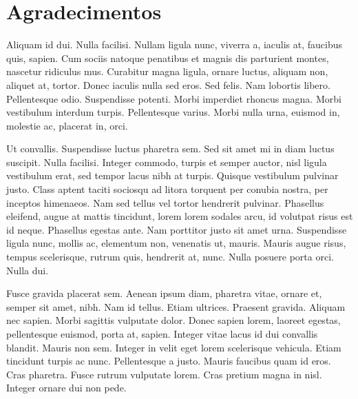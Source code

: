 \chapter*{Agradecimentos}

Aliquam id dui. Nulla facilisi. Nullam ligula nunc, viverra a, iaculis
at, faucibus quis, sapien. Cum sociis natoque penatibus et magnis dis
parturient montes, nascetur ridiculus mus. Curabitur magna ligula,
ornare luctus, aliquam non, aliquet at, tortor. Donec iaculis nulla
sed eros. Sed felis. Nam lobortis libero. Pellentesque
odio. Suspendisse potenti. Morbi imperdiet rhoncus magna. Morbi
vestibulum interdum turpis. Pellentesque varius. Morbi nulla urna,
euismod in, molestie ac, placerat in, orci. 

Ut convallis. Suspendisse luctus pharetra sem. Sed sit amet mi in diam
luctus suscipit. Nulla facilisi. Integer commodo, turpis et semper
auctor, nisl ligula vestibulum erat, sed tempor lacus nibh at
turpis. Quisque vestibulum pulvinar justo. Class aptent taciti
sociosqu ad litora torquent per conubia nostra, per inceptos
himenaeos. Nam sed tellus vel tortor hendrerit pulvinar. Phasellus
eleifend, augue at mattis tincidunt, lorem lorem sodales arcu, id
volutpat risus est id neque. Phasellus egestas ante. Nam porttitor
justo sit amet urna. Suspendisse ligula nunc, mollis ac, elementum
non, venenatis ut, mauris. Mauris augue risus, tempus scelerisque,
rutrum quis, hendrerit at, nunc. Nulla posuere porta orci. Nulla dui. 

Fusce gravida placerat sem. Aenean ipsum diam, pharetra vitae, ornare
et, semper sit amet, nibh. Nam id tellus. Etiam ultrices. Praesent
gravida. Aliquam nec sapien. Morbi sagittis vulputate dolor. Donec
sapien lorem, laoreet egestas, pellentesque euismod, porta at,
sapien. Integer vitae lacus id dui convallis blandit. Mauris non
sem. Integer in velit eget lorem scelerisque vehicula. Etiam tincidunt
turpis ac nunc. Pellentesque a justo. Mauris faucibus quam id
eros. Cras pharetra. Fusce rutrum vulputate lorem. Cras pretium magna
in nisl. Integer ornare dui non pede. 

\vspace{10mm}
